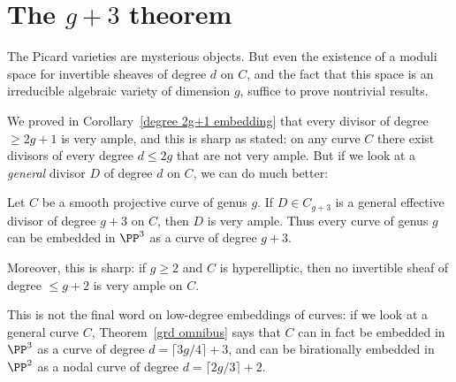 \section{The $g+3$ theorem}\label{g+3 section}

The Picard varieties are mysterious objects.  But even the
existence of
a  moduli space for invertible sheaves of degree $d$ on $C$, and
the fact
that this space is an irreducible algebraic variety of dimension $g$,
suffice to prove nontrivial results.

We proved in Corollary~\ref{degree 2g+1 embedding} that every divisor
of degree $\geq 2g+1$ is very ample, and this is sharp as stated: on
any curve $C$ there exist divisors of every degree $d \leq 2g$ that
are not very ample. But if we look at a \emph{general} divisor $D$ of
degree $d$ on  $C$, we can do much better:

\begin{theorem}[$g+3$ theorem]\label{g+3 theorem}
Let $C$ be a smooth projective curve of genus $g$. If $D \in C_{g+3}$
is a general effective divisor of degree $g+3$ on $C$, then $D$ is
very ample.
%
%
Thus
every curve of genus $g$
can
be embedded in $\PP^3$ as a curve of degree $g+3$.

Moreover, this is sharp: if $g\geq 2$ and $C$ is
hyperelliptic,
%
then no invertible sheaf of degree $\leq g+2$ is very ample on $C$.
\end{theorem}

This is not the final word on low-degree embeddings of curves: if we look at a general curve $C$, Theorem~\ref{grd omnibus} says that $C$ can in fact be embedded in $\PP^{3}$ as a curve of degree $d = \lceil 3g/4 \rceil + 3$, and can be birationally embedded in $\PP^2$ as a nodal curve of degree $d = \lceil 2g/3 \rceil + 2$.


